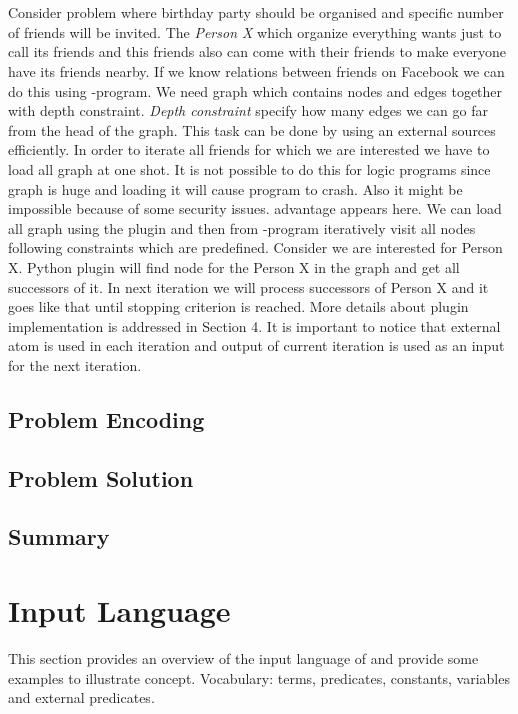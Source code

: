 \documentclass[14pt,a4paper, titlepage]{article}
\begin{document}
\\ \\ Consider problem where birthday party should be organised and specific number of friends will be invited. The \emph{Person X} which organize everything wants just to call its friends and this friends also can come with their friends to make everyone have its friends nearby. If we know relations between friends on Facebook we can do this using \hex{}-program. We need graph which contains nodes and edges together with depth constraint. \emph{Depth constraint} specify how many edges we can go far from  the head of the graph. This task can be done by using an external sources efficiently. In order to iterate all friends for which we are interested we have to load all graph at one shot. It is not possible to do this for logic programs since graph is huge and loading it will cause program to crash. Also it might be impossible because of some security issues. \dlvhex{} advantage appears here. We can load all graph using the plugin and then from \hex{}-program iteratively visit all nodes following constraints which are predefined. Consider we are interested for Person X. Python plugin will find node for the Person X in the graph and get all successors of it. In next iteration we will process successors of Person X and it goes like that until stopping criterion is reached. More details about plugin implementation is addressed in Section 4. It is important to notice that external atom is used in each iteration and output of current iteration is used as an input for the next iteration.              


\subsection{Problem Encoding}
\subsection{Problem Solution}
\subsection{Summary}

\newpage
\section{Input Language}%
This section provides an overview of the input language of \dlvhex{} and provide some examples to illustrate concept. Vocabulary: terms, predicates, constants, variables and external predicates.   
\end{document}
